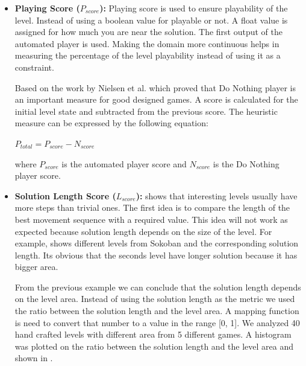 \begin{itemize}
	\item \textbf{Playing Score ($P_{score}$):} Playing score is used to ensure playability of the level. Instead of using a boolean value for playable or not. A float value is assigned for how much you are near the solution. The first output of the automated player is used. Making the domain more continuous helps in measuring the percentage of the level playability instead of using it as a constraint.\\\par
	
	Based on the work by Nielsen et al.\cite{gvgpPerformanceProfiles} which proved that Do Nothing player is an important measure for good designed games. A score is calculated for the initial level state and subtracted from the previous score. The heuristic measure can be expressed by the following equation:
	\begin{center}$ P_{total} = P_{score} - N_{score}$\end{center}
	where $P_{score}$ is the automated player score and $N_{score}$ is the Do Nothing player score.
	
	\item\textbf{Solution Length Score ($L_{score}$):}  shows that interesting levels usually have more steps than trivial ones. The first idea is to compare the length of the best movement sequence with a required value. This idea will not work as expected because solution length depends on the size of the level. For example,  shows different levels from Sokoban and the corresponding solution length. Its obvious that the seconds level have longer solution because it has bigger area.
	
	
	From the previous example we can conclude that the solution length depends on the level area. Instead of using the solution length as the metric we used the ratio between the solution length and the level area. A mapping function is need to convert that number to a value in the range [0, 1]. We analyzed 40 hand crafted levels with different area from 5 different games. A histogram was plotted on the ratio between the solution length and the level area and shown in .
	
	

\end{itemize}
